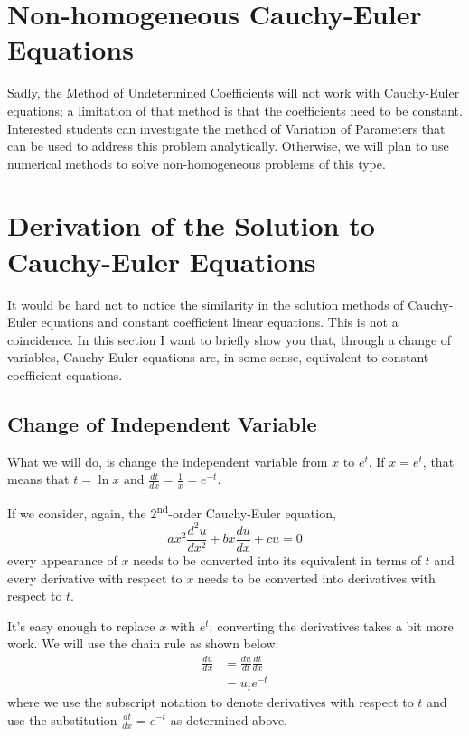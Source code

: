 \section{Non-homogeneous Cauchy-Euler Equations}
Sadly, the Method of Undetermined Coefficients will not work with Cauchy-Euler equations; a limitation of that method is that the coefficients need to be constant. Interested students can investigate the method of Variation of Parameters that can be used to address this problem analytically.  Otherwise, we will plan to use numerical methods to solve non-homogeneous problems of this type.

\section{Derivation of the Solution to Cauchy-Euler Equations}
It would be hard not to notice the similarity in the solution methods of Cauchy-Euler equations and constant coefficient linear equations.  This is not a coincidence.  In this section I want to briefly show you that, through a change of variables, Cauchy-Euler equations are, in some sense, equivalent to constant coefficient equations.

\subsection{Change of Independent Variable}
What we will do, is change the independent variable from $x$ to $e^t$.  If $x = e^t$, that means that $t = \ln{x}$ and $\frac{dt}{dx} = \frac{1}{x} = e^{-t}$.

If we consider, again, the 2\textsuperscript{nd}-order Cauchy-Euler equation,
\begin{equation*}
ax^2\frac{d^2u}{dx^2}+bx\frac{du}{dx}+cu = 0
\end{equation*}
every appearance of $x$ needs to be converted into its equivalent in terms of $t$ and every derivative with respect to $x$ needs to be converted into derivatives with respect to $t$.

It's easy enough to replace $x$ with $e^t$; converting the derivatives takes a bit more work.  We will use the chain rule as shown below:
\begin{align*}
\frac{du}{dx} &= \frac{du}{dt} \frac{dt}{dx} \\
&=u_t e^{-t}
\end{align*}
where we use the subscript notation to denote derivatives with respect to $t$ and use the substitution $\frac{dt}{dx}=e^{-t}$ as determined above.

